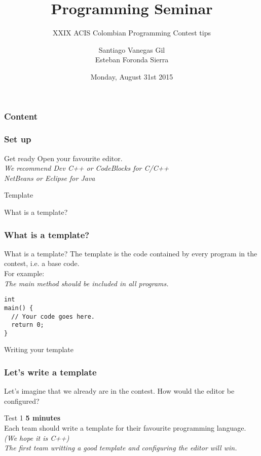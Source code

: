 \documentclass{beamer}
\title{Programming Seminar}
\subtitle{XXIX ACIS Colombian Programming Contest tips}
\author{Santiago Vanegas Gil\\Esteban Foronda Sierra}
\institute{EAFIT University}
\date{Monday, August 31st 2015}
\begin{document}
\begin{frame}
	\titlepage
\end{frame}

\begin{frame}
	\frametitle{Content}
	\tableofcontents
\end{frame}

\begin{frame}[fragile]
	\frametitle{Set up}
	\begin{block}{Get ready}
		Open your favourite editor.\\
		\emph{We recommend Dev C++ or CodeBlocks for C/C++\\
			NetBeans or Eclipse for Java}
	\end{block}
\end{frame}

\begin{section}{Template}
\begin{subsection}{What is a template?}
\begin{frame}[fragile]
	\frametitle{What is a template?}
	\begin{block}{What is a template?}
		The template is the code contained by every program in the contest, i.e. a base code.\\
		For example:\\
		\emph{The main method should be included in all programs.}
		\begin{lstlisting}
int
main() {
  // Your code goes here.
  return 0;
}
		\end{lstlisting}
	\end{block}
\end{frame}
\end{subsection}

\begin{subsection}{Writing your template}
\begin{frame}[fragile]
	\frametitle{Let's write a template}
	Let's imagine that we already are in the contest. How would the editor be configured?\\
	\begin{block}{Test 1}
		\textbf{5 minutes}\\
		Each team should write a template for their favourite programming language. \emph{(We hope it is C++)}\\
		\emph{The first team writting a good template and configuring the editor will win.}
		\pause
	\end{block}
\end{frame}
\end{subsection}


\end{section}
\end{document}
